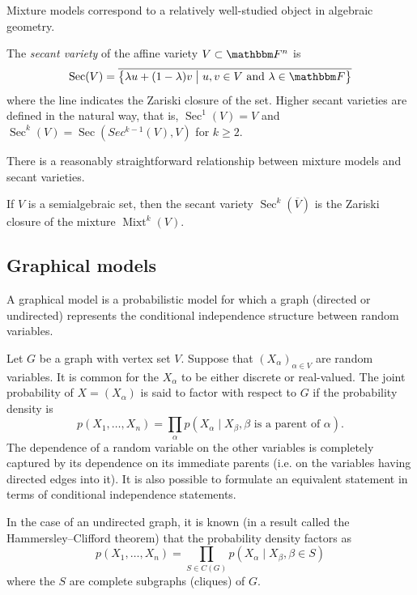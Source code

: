 \documentclass[11pt,titlepage]{article}
\newcommand*{\vbar}{\;\big\vert\;}
\DeclareMathOperator{\Mixt}{Mixt}
\DeclareMathOperator{\Sec}{Sec}
\begin{document}
    Mixture models correspond to a relatively well-studied object in algebraic
    geometry.
    \begin{definition}
    The \emph{secant variety} of the affine variety $V \subset \F^n$ is
    \[
        \Sec(V) = \overline{\cdil[\big]{
        \lambda u + (1 - \lambda) v \vbar
        u,v \in V
        \text{ and }
        \lambda \in \F
        }}
    \]
    where the line indicates the Zariski closure of the set.  Higher secant
    varieties are defined in the natural way, that is, $\Sec^1(V) = V$ and
    $\Sec^k(V) = \Sec(Sec^{k-1}(V), V)$ for $k \ge 2$.
    \end{definition}

    There is a reasonably straightforward relationship between mixture models
    and secant varieties.
    \begin{proposition}
    If $V$ is a semialgebraic set, then the secant variety
    $\Sec^k(\overline{V})$ is the Zariski closure of the mixture $\Mixt^k(V)$.
    \end{proposition}

\subsection{Graphical models}

    A graphical model is a probabilistic model for which a graph (directed or
    undirected) represents the conditional independence structure between random
    variables. 

    Let $G$ be a graph with vertex set $V$.  Suppose that $(X_\alpha)_{\alpha
    \in V}$ are random variables.  It is common for the $X_\alpha$ to be either
    discrete or real-valued.  The joint probability of $X = (X_\alpha)$ is said
    to factor with respect to $G$ if the probability density is
    \[
        p(X_1, \ldots, X_n) = 
            \prod_\alpha p(X_\alpha \mid X_\beta, \beta \text{ is a parent of }
            \alpha).
    \]
    The dependence of a random variable on the other variables is completely
    captured by its dependence on its immediate parents (i.e. on the variables
    having directed edges into it).  It is also possible to formulate an
    equivalent statement in terms of conditional independence statements.

    In the case of an undirected graph, it is known (in a result called the
    Hammersley–Clifford theorem) that the probability density factors as
    \[
        p(X_1, \ldots, X_n) = 
            \prod_{S \in C(G)} p(X_\alpha \mid X_\beta, \beta \in S)
    \]
    where the $S$ are complete subgraphs (cliques) of $G$.
\end{document}
